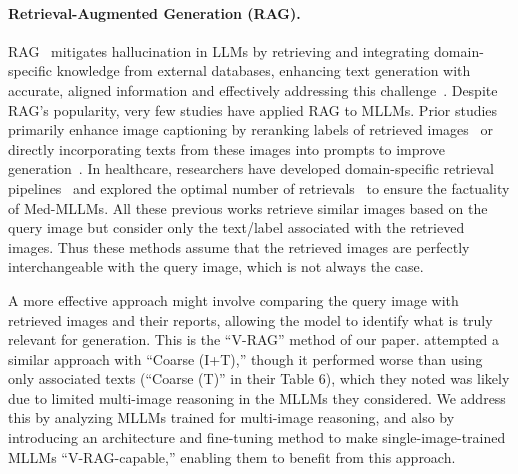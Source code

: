 \paragraph{Retrieval-Augmented Generation (RAG).} 
RAG~\cite{Lewis2020RetrievalAugmentedGF} mitigates hallucination in LLMs by retrieving and integrating domain-specific knowledge from external databases, enhancing text generation with accurate, aligned information and effectively addressing this challenge~\cite{Guu2020REALMRL, Siriwardhana2022ImprovingTD, Shahul2023RAGAsAE}.
Despite RAG's popularity, very few studies have applied RAG to MLLMs. 
Prior studies primarily enhance image captioning by reranking labels of retrieved images~\cite{Liu2024RARRA,Qu2024AlleviatingHI} or directly incorporating texts from these images into prompts to improve generation~\cite{Liu2023LearningCV, Sarto2024TowardsRA, Zhou2024Img2LocRI}. 
In healthcare, researchers have developed domain-specific retrieval pipelines~\cite{Sun2024FactAwareMR} and explored the optimal number of retrievals~\cite{Xia2024RULERM} to ensure the factuality of Med-MLLMs.
All these previous works retrieve similar images based on the query image but consider only the text/label associated with the retrieved images.
Thus these methods assume that the retrieved images are perfectly interchangeable with the query image, which is not always the case. 

A more effective approach might involve comparing the query image with retrieved images and their reports, allowing the model to identify what is truly relevant for generation.  This is the ``V-RAG'' method of our paper.
\citet{august} attempted a similar approach with ``Coarse (I+T),'' though it performed worse than using only associated texts (``Coarse (T)'' in their Table 6), which they noted was likely due to limited multi-image reasoning in the MLLMs they considered. 
We address this by analyzing MLLMs trained for multi-image reasoning, and also by introducing an architecture and fine-tuning method to make single-image-trained MLLMs ``V-RAG-capable,'' enabling them to benefit from this approach.